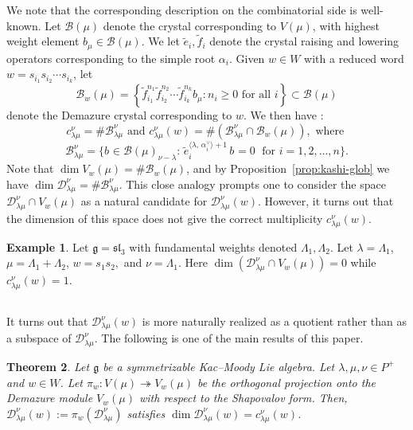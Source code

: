 \documentclass[12pt,reqno]{amsart}
\theoremstyle{plain}
\newtheorem{theorem}{Theorem}[section]
\theoremstyle{definition}
\newtheorem{example}[theorem]{Example}
\theoremstyle{remark}
\theoremstyle{plain}
\newcommand{\crys}{\mathcal{B}}
\newcommand{\mcdw}{\mathcal{D}_{\!\lambda\mu}^{\nu}(w)}
\newcommand{\mcd}{\mathcal{D}_{\!\lambda\mu}^{\nu}}
\newcommand{\lrw}{c_{\lambda\mu}^\nu(w)}
\newcommand{\lr}{c_{\lambda\mu}^\nu}
\newcommand{\hwcrys}[1][]{{b}_{#1}}
\begin{document}
We note that the corresponding description on the combinatorial side is well-known. 
Let $\crys(\mu)$ denote the crystal corresponding to $V(\mu)$, with highest weight element $\hwcrys[\mu] \in \crys(\mu)$. We let $\tilde{e}_i, \tilde{f}_i$ denote the crystal raising and lowering operators corresponding to the simple root $\alpha_i$. Given $w \in W$ with a reduced word $w = s_{i_1} s_{i_2} \cdots s_{i_k}$, let 
\[ \crys_w(\mu) = \left\{ \tilde{f}_{i_1}^{n_1} \tilde{f}_{i_2}^{n_2} \cdots \tilde{f}_{i_k}^{n_k} \hwcrys[\mu]: n_i \geq 0 \text{ for all } i\right\} \subset \crys(\mu)\]
denote the Demazure crystal corresponding to $w$. We then have \cite{J2,KRV}:
\[\lr = \# \crys_{\lambda\mu}^\nu \text{ and } \lrw = \# \left( \crys_{\lambda\mu}^\nu \cap \crys_w(\mu) \right), \text{ where }\]
\begin{equation}\label{eq:crysmult}
\crys_{\lambda\mu}^\nu=\{\hwcrys \in \crys(\mu)_{\nu-\lambda}:\, \tilde{e}_i^{\langle \lambda, \,\alpha_i^{\vee}\rangle +1}\,\hwcrys=0 \;\text{ for } i=1,2, \ldots, n\}.
\end{equation}
Note that  $\dim V_w(\mu) = \# \crys_w(\mu)$, and by Proposition~\ref{prop:kashi-glob} we have $\dim \mcd = \#\crys_{\lambda\mu}^\nu$. 
This close analogy prompts one to consider the space $\mcd\cap V_w(\mu)$ as a natural 
candidate for $\mcdw$. However, it turns out that the dimension of this space does not give the correct multiplicity $\lrw$.
\begin{example}\label{Dintproj}
Let $\mathfrak{g}=\mathfrak{sl}_3$ with fundamental weights denoted $\Lambda_1, \Lambda_2$. Let $\lambda=\Lambda_1$, $ \mu=\Lambda_1+\Lambda_2$, $ w=s_1s_2,$ and $ \nu=\Lambda_1.$ Here 
$\dim (\mcd\cap V_w(\mu)) =0$ while $\lrw=1$. 
\end{example}

\subsection{}\label{sec:mainthmshap}
It turns out that $\mcdw$ is more naturally realized as a quotient rather than as a subspace of $\mcd$. The following is one of the main results of this paper. 
\begin{theorem}\label{thm:shap-proj-w}
    Let $\mathfrak{g}$ be a symmetrizable Kac--Moody Lie algebra. Let $\lambda, \mu, \nu \in P^+$ and $w \in W$.
    Let $\pi_w: V(\mu)\twoheadrightarrow V_w(\mu)$ be the orthogonal projection onto the Demazure module $V_w(\mu)$ with respect to the Shapovalov form. Then, $\mcdw:= \pi_w\left(\mcd\right)$ satisfies $\dim \mcdw=c_{\lambda\mu}^{\nu}(w)$.
    \end{theorem}
\end{document}
